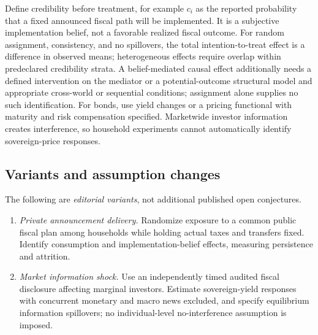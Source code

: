 \documentclass[11pt,a4paper]{article}
\begin{document}
Define credibility before treatment, for example \(c_i\) as the reported probability that a fixed announced fiscal path will be implemented. It is a subjective implementation belief, not a favorable realized fiscal outcome. For random assignment, consistency, and no spillovers, the total intention-to-treat effect is a difference in observed means; heterogeneous effects require overlap within predeclared credibility strata. A belief-mediated causal effect additionally needs a defined intervention on the mediator or a potential-outcome structural model and appropriate cross-world or sequential conditions; assignment alone supplies no such identification. For bonds, use yield changes or a pricing functional with maturity and risk compensation specified. Marketwide investor information creates interference, so household experiments cannot automatically identify sovereign-price responses.
\subsection*{Variants and assumption changes}
The following are \emph{editorial variants}, not additional published open conjectures.
\begin{enumerate}
\item \emph{Private announcement delivery.} Randomize exposure to a common public fiscal plan among households while holding actual taxes and transfers fixed. Identify consumption and implementation-belief effects, measuring persistence and attrition.
\item \emph{Market information shock.} Use an independently timed audited fiscal disclosure affecting marginal investors. Estimate sovereign-yield responses with concurrent monetary and macro news excluded, and specify equilibrium information spillovers; no individual-level no-interference assumption is imposed.
\end{enumerate}
\end{document}
